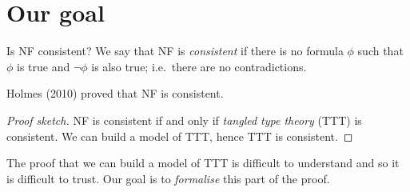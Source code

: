 \documentclass[xcolor=dvipsnames]{beamer}
\begin{document}
\section{Our goal}

\begin{frame}{Is NF consistent?}
    We say that NF is \emph{consistent} if there is no formula \( \phi \) such that \( \phi \) is true and \( \neg\phi \) is also true; i.e.\, there are no contradictions.

    Holmes (2010) proved that NF is consistent.

    \begin{proof}[Proof sketch]
        NF is consistent if and only if \emph{tangled type theory} (TTT) is consistent.
        We can build a model of TTT, hence TTT is consistent.
    \end{proof}

    The proof that we can build a model of TTT is difficult to understand and so it is difficult to trust. Our goal is to \emph{formalise} this part of the proof.
\end{frame}


\end{document}

